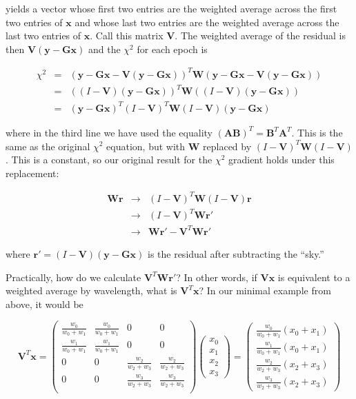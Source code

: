 \documentclass[12pt]{article}
\newcommand{\G}{\mathbf{G}}
\newcommand{\x}{\mathbf{x}}
\newcommand{\y}{\mathbf{y}}
\newcommand{\rvect}{\mathbf{r}}
\newcommand{\W}{\mathbf{W}}
\newcommand{\V}{\mathbf{V}}
\begin{document}
\noindent yields a vector whose first two entries are the weighted
average across the first two entries of $\x$ and whose last two
entries are the weighted average across the last two entries of
$\x$. Call this matrix $\V$. The weighted average of the residual is then
$\V (\y - \G\x)$ and the $\chi^2$ for each epoch is

\begin{eqnarray*}
\chi^2 &=& (\y - \G\x - \V(\y - \G\x))^T \W (\y - \G\x - \V(\y - \G\x)) \\
       &=& ((I - \V)(\y - \G\x))^T \W ((I - \V)(\y - \G\x)) \\
       &=& (\y - \G\x)^T (I - \V)^T \W (I - \V) (\y - \G\x)
\end{eqnarray*}

\noindent where in the third line we have used the equality
$(\mathbf{A}\mathbf{B})^T = \mathbf{B}^T \mathbf{A}^T$. This is the
same as the original $\chi^2$ equation, but with $\W$ replaced by $(I
- \V)^T \W (I - \V)$. This is a constant, so our original result for the
$\chi^2$ gradient holds under this replacement:

\begin{eqnarray*}
\W \rvect &\to& (I - \V)^T \W (I - \V) \rvect \\
          &\to& (I - \V)^T \W \mathbf{r'} \\
          &\to& \W \mathbf{r'} - \V^T \W \mathbf{r'}
\end{eqnarray*}

\noindent where $\mathbf{r'} = (I - \V)(\y - \G\x)$ is the residual after
subtracting the ``sky.''

Practically, how do we calculate $\V^T \W \mathbf{r'}$? In other words, if
$\V \x$ is equivalent to a weighted average by wavelength, what is $\V^T \x$?
In our minimal example from above, it would be

\begin{equation}
  \V^T \x
  = \left( \begin{array}{cccc}
    \frac{w_0}{w_0 + w_1} & \frac{w_0}{w_0 + w_1} & 0 & 0 \\
    \frac{w_1}{w_0 + w_1} & \frac{w_1}{w_0 + w_1} & 0 & 0 \\
    0   & 0   & \frac{w_2}{w_2 + w_3} & \frac{w_2}{w_2 + w_3} \\
    0   & 0   & \frac{w_3}{w_2 + w_3} & \frac{w_3}{w_2 + w_3} \\
    \end{array} \right)
    \left( \begin{array}{c} x_0 \\ x_1 \\ x_2 \\ x_3 \end{array} \right)
  = \left( \begin{array}{c}
    \frac{w_0}{w_0 + w_1} (x_0 + x_1) \\
    \frac{w_1}{w_0 + w_1} (x_0 + x_1) \\
    \frac{w_2}{w_2 + w_3} (x_2 + x_3) \\
    \frac{w_3}{w_2 + w_3} (x_2 + x_3)
    \end{array} \right)
\end{equation}
\end{document}
